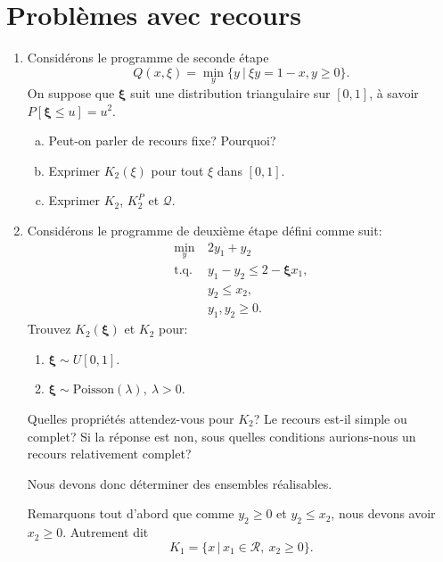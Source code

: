 \documentclass[12pt]{book}
\def\cQ {\mathcal{Q}}
\def\cR {\mathcal{R}}
\def\bxi {\boldsymbol{\xi}}
\newcounter {exercisecount}[section]
\newenvironment {exercise}{}{}%
\begin{document}
\chapter{Problèmes avec recours}

\mbox{}

\mbox{}

\begin{enumerate}
\item
\begin {exercise}
Considérons le programme de seconde étape
\[
Q(x, \xi) = \min_y \lbrace y \ |\ \xi y = 1-x, y \geq 0 \rbrace.
\]
On suppose que $\bxi$ suit une distribution triangulaire sur $[0,1]$, à savoir $P[\bxi \leq u] = u^2$.
\begin{enumerate}[(a)]
\item
Peut-on parler de recours fixe? Pourquoi?
\item
Exprimer $K_2(\xi)$ pour tout $\xi$ dans $[0,1]$.
\item
Exprimer $K_2$, $K_2^P$ et $\cQ$.
\end{enumerate}
\end {exercise}

\item
\begin{exercise}
Considérons le programme de deuxième étape défini comme suit:
\begin{align*}
\min_y\ & 2y_1+y_2\\
\mbox{t.q. } & y_1 - y_2 \leq 2-\bxi x_1,\\
& y_2 \leq x_2,\\
& y_1, y_2 \geq 0.
\end{align*}
Trouvez $K_2(\bxi)$ et $K_2$ pour:
\begin{enumerate}
\item
$\bxi \sim U[0,1]$.
\item
$\bxi \sim \mbox{Poisson}(\lambda),\ \lambda > 0$.
\end{enumerate}
Quelles propriétés attendez-vous pour $K_2$?
Le recours est-il simple ou complet? Si la réponse est non, sous quelles conditions aurions-nous un recours relativement complet?
\end{exercise}

Nous devons donc déterminer des ensembles réalisables.

\mbox{}

Remarquons tout d'abord que comme $y_2 \geq 0$ et $y_2 \leq x_2$, nous
devons avoir $x_2 \geq 0$.
Autrement dit
$$
K_1 = \{ x \,|\, x_1 \in \cR,\ x_2 \geq 0 \}.
$$


\end{enumerate}
\end{document}
